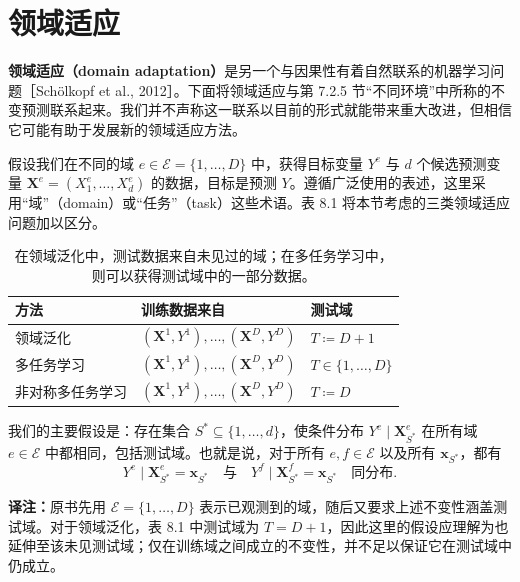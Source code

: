 \section{领域适应}
\label{sec:ch08-domain}

\textbf{领域适应（domain adaptation）}是另一个与因果性有着自然联系的机器学习问题［Schölkopf et al., 2012］。下面将领域适应与第 7.2.5 节“不同环境”中所称的不变预测联系起来。我们并不声称这一联系以目前的形式就能带来重大改进，但相信它可能有助于发展新的领域适应方法。

假设我们在不同的域 $e\in\mathcal E=\{1,\ldots,D\}$ 中，获得目标变量 $Y^e$ 与 $d$ 个候选预测变量 $\mathbf X^e=(X^e_1,\ldots,X^e_d)$ 的数据，目标是预测 $Y$。遵循广泛使用的表述，这里采用“域”（domain）或“任务”（task）这些术语。表 8.1 将本节考虑的三类领域适应问题加以区分。

\begin{table}[!htbp]
 \centering
 \small
 \begin{tabular}{@{}lll@{}}
  \toprule
  方法 & 训练数据来自 & 测试域 \\
  \midrule
  领域泛化 & $(\mathbf X^1,Y^1),\ldots,(\mathbf X^D,Y^D)$ & $T\coloneqq D+1$ \\
  多任务学习 & $(\mathbf X^1,Y^1),\ldots,(\mathbf X^D,Y^D)$ & $T\in\{1,\ldots,D\}$ \\
  非对称多任务学习 & $(\mathbf X^1,Y^1),\ldots,(\mathbf X^D,Y^D)$ & $T\coloneqq D$ \\
  \bottomrule
 \end{tabular}
 \caption{在领域泛化中，测试数据来自未见过的域；在多任务学习中，则可以获得测试域中的一部分数据。}
 \label{tab:ch08-domains}
\end{table}

我们的主要假设是：存在集合 $S^*\subseteq\{1,\ldots,d\}$，使条件分布 $Y^e\mid\mathbf X^e_{S^*}$ 在所有域 $e\in\mathcal E$ 中都相同，包括测试域。也就是说，对于所有 $e,f\in\mathcal E$ 以及所有 $\mathbf x_{S^*}$，都有
\begin{equation}
 Y^e\mid\mathbf X^e_{S^*}=\mathbf x_{S^*}
 \quad\text{与}\quad
 Y^f\mid\mathbf X^f_{S^*}=\mathbf x_{S^*}
 \quad\text{同分布}.
 \tag{8.7}
\end{equation}

\par\smallskip
{\small\noindent\textbf{译注：}原书先用 $\mathcal E=\{1,\ldots,D\}$ 表示已观测到的域，随后又要求上述不变性涵盖测试域。对于领域泛化，表 8.1 中测试域为 $T=D+1$，因此这里的假设应理解为也延伸至该未见测试域；仅在训练域之间成立的不变性，并不足以保证它在测试域中仍成立。}
\par\smallskip


